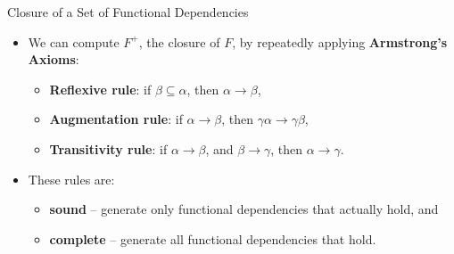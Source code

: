 \documentclass{beamer}
\begin{document}
\begin{frame}{Closure of a Set of Functional Dependencies}
    \begin{itemize}
        \item We can compute $F^+$, the closure of $F$, by repeatedly applying \textbf{Armstrong's Axioms}:
            \begin{itemize}
                \item \textbf{Reflexive rule}: if $\beta \subseteq \alpha$, then $\alpha \rightarrow \beta$,
                \item \textbf{Augmentation rule}: if $\alpha \rightarrow \beta$, then $\gamma \alpha \rightarrow \gamma \beta$,
                \item \textbf{Transitivity rule}: if $\alpha \rightarrow \beta$, and $\beta \rightarrow \gamma$, then $\alpha \rightarrow \gamma$.
            \end{itemize}
        \item These rules are:
            \begin{itemize}
                \item \textbf{sound} -- generate only functional dependencies that actually hold, and
                \item \textbf{complete} -- generate all functional dependencies that hold.
            \end{itemize}
    \end{itemize}
\end{frame}
\end{document}
